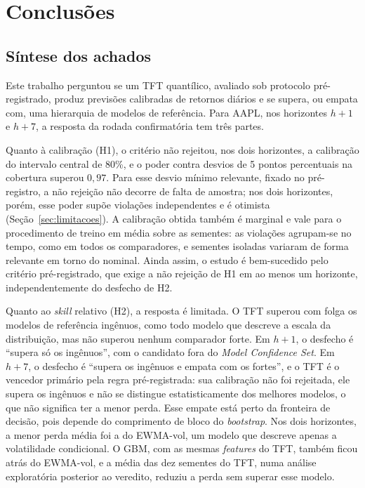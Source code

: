 \chapter{Conclusões} \label{chap:conclusoes}


\section{Síntese dos achados}
Este trabalho perguntou se um TFT quantílico, avaliado sob protocolo pré-registrado, produz previsões calibradas de retornos diários e se supera, ou empata com, uma hierarquia de modelos de referência. Para AAPL, nos horizontes \(h+1\) e \(h+7\), a resposta da rodada confirmatória tem três partes.

Quanto à calibração (H1), o critério não rejeitou, nos dois horizontes, a calibração do intervalo central de 80\%, e o poder contra desvios de 5 pontos percentuais na cobertura superou \(0{,}97\). Para esse desvio mínimo relevante, fixado no pré-registro, a não rejeição não decorre de falta de amostra; nos dois horizontes, porém, esse poder supõe violações independentes e é otimista (Seção~\ref{sec:limitacoes}). A calibração obtida também é marginal e vale para o procedimento de treino em média sobre as sementes: as violações agrupam-se no tempo, como em todos os comparadores, e sementes isoladas variaram de forma relevante em torno do nominal. Ainda assim, o estudo é bem-sucedido pelo critério pré-registrado, que exige a não rejeição de H1 em ao menos um horizonte, independentemente do desfecho de H2.

Quanto ao \textit{skill} relativo (H2), a resposta é limitada. O TFT superou com folga os modelos de referência ingênuos, como todo modelo que descreve a escala da distribuição, mas não superou nenhum comparador forte. Em \(h+1\), o desfecho é ``supera só os ingênuos'', com o candidato fora do \textit{Model Confidence Set}. Em \(h+7\), o desfecho é ``supera os ingênuos e empata com os fortes'', e o TFT é o vencedor primário pela regra pré-registrada: sua calibração não foi rejeitada, ele supera os ingênuos e não se distingue estatisticamente dos melhores modelos, o que não significa ter a menor perda. Esse empate está perto da fronteira de decisão, pois depende do comprimento de bloco do \textit{bootstrap}. Nos dois horizontes, a menor perda média foi a do EWMA-vol, um modelo que descreve apenas a volatilidade condicional. O GBM, com as mesmas \textit{features} do TFT, também ficou atrás do EWMA-vol, e a média das dez sementes do TFT, numa análise exploratória posterior ao veredito, reduziu a perda sem superar esse modelo.

